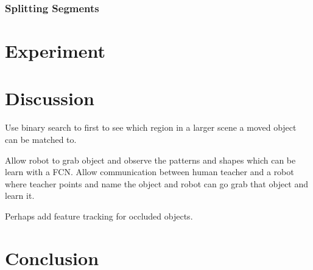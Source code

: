 \documentclass{article}
\begin{document}
\subsubsection{Splitting Segments}

\section{Experiment}

\section{Discussion}

Use binary search to first to see which region in a larger scene a moved object can be matched to.

Allow robot to grab object and observe the patterns and shapes which can be learn with a FCN. Allow communication between human teacher and a robot where teacher points and name the object and robot can go grab that object and learn it.  

Perhaps add feature tracking for occluded objects. 

\section{Conclusion}
\end{document}
